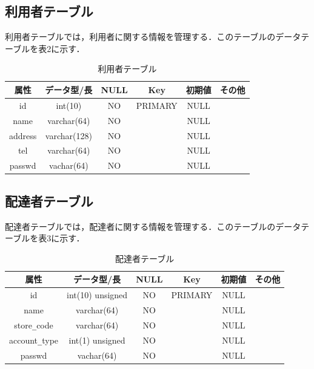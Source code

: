 \documentclass[a4j,titlepage]{jarticle}
\begin{document}
\subsection{利用者テーブル}
利用者テーブルでは，利用者に関する情報を管理する．このテーブルのデータテーブルを表2に示す．
\begin{table}[htbp]
\begin{center}
 \caption{利用者テーブル}
  \begin{tabular}{|c|c|c|c|c|c|}\hline
    属性 & データ型/長 & NULL & Key & 初期値 & その他\\ \hline \hline
    id & int(10) & NO & PRIMARY & NULL & \\ \hline
    name & varchar(64) & NO &  & NULL & \\ \hline
    address & varchar(128) & NO &  & NULL & \\ \hline
    tel & varchar(64) & NO &  & NULL & \\ \hline
    passwd & vachar(64) & NO &  & NULL & \\ \hline
  \end{tabular}
\end{center}
\end{table}

\subsection{配達者テーブル}
配達者テーブルでは，配達者に関する情報を管理する．このテーブルのデータテーブルを表3に示す．
\begin{table}[htbp]
\begin{center}
 \caption{配達者テーブル}
  \begin{tabular}{|c|c|c|c|c|c|}\hline
    属性 & データ型/長 & NULL & Key & 初期値 & その他\\ \hline \hline
    id & int(10) unsigned & NO & PRIMARY & NULL & \\ \hline
    name & varchar(64) & NO &  & NULL & \\ \hline
    store\verb|_|code & varchar(64) & NO &  & NULL & \\ \hline
    account\verb|_|type & int(1) unsigned & NO &  & NULL & \\ \hline
    passwd & vachar(64) & NO &  & NULL & \\ \hline
  \end{tabular}
\end{center}
\end{table}
\end{document}

